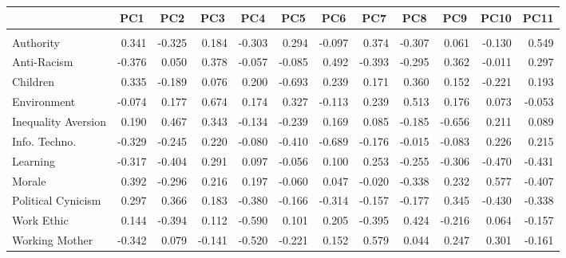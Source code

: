 
\begin{tabular}{lrrrrrrrrrrr}
\toprule
  & \multicolumn{1}{c}{PC1} & \multicolumn{1}{c}{PC2} & \multicolumn{1}{c}{PC3} & \multicolumn{1}{c}{PC4} & \multicolumn{1}{c}{PC5} & \multicolumn{1}{c}{PC6} & \multicolumn{1}{c}{PC7} & \multicolumn{1}{c}{PC8} & \multicolumn{1}{c}{PC9} & \multicolumn{1}{c}{PC10} & \multicolumn{1}{c}{PC11}\\
\midrule
\addlinespace[0.3em]
\multicolumn{12}{l}{\textbf{BCS70 - Age 30}}\\
\hline
\hspace{1em}Authority & 0.341 & -0.325 & 0.184 & -0.303 & 0.294 & -0.097 & 0.374 & -0.307 & 0.061 & -0.130 & 0.549\\
\hspace{1em}Anti-Racism & -0.376 & 0.050 & 0.378 & -0.057 & -0.085 & 0.492 & -0.393 & -0.295 & 0.362 & -0.011 & 0.297\\
\hspace{1em}Children & 0.335 & -0.189 & 0.076 & 0.200 & -0.693 & 0.239 & 0.171 & 0.360 & 0.152 & -0.221 & 0.193\\
\hspace{1em}Environment & -0.074 & 0.177 & 0.674 & 0.174 & 0.327 & -0.113 & 0.239 & 0.513 & 0.176 & 0.073 & -0.053\\
\hspace{1em}Inequality Aversion & 0.190 & 0.467 & 0.343 & -0.134 & -0.239 & 0.169 & 0.085 & -0.185 & -0.656 & 0.211 & 0.089\\
\hspace{1em}Info. Techno. & -0.329 & -0.245 & 0.220 & -0.080 & -0.410 & -0.689 & -0.176 & -0.015 & -0.083 & 0.226 & 0.215\\
\hspace{1em}Learning & -0.317 & -0.404 & 0.291 & 0.097 & -0.056 & 0.100 & 0.253 & -0.255 & -0.306 & -0.470 & -0.431\\
\hspace{1em}Morale & 0.392 & -0.296 & 0.216 & 0.197 & -0.060 & 0.047 & -0.020 & -0.338 & 0.232 & 0.577 & -0.407\\
\hspace{1em}Political Cynicism & 0.297 & 0.366 & 0.183 & -0.380 & -0.166 & -0.314 & -0.157 & -0.177 & 0.345 & -0.430 & -0.338\\
\hspace{1em}Work Ethic & 0.144 & -0.394 & 0.112 & -0.590 & 0.101 & 0.205 & -0.395 & 0.424 & -0.216 & 0.064 & -0.157\\
\hspace{1em}Working Mother & -0.342 & 0.079 & -0.141 & -0.520 & -0.221 & 0.152 & 0.579 & 0.044 & 0.247 & 0.301 & -0.161\\

\end{tabular}
